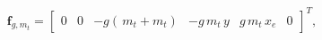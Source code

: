 \documentclass{article}
\begin{document}
\begin{small}
    \begin{equation}
        \mathbf{f}_{g,m_t} = 
        \begin{bmatrix}
         0 &  0 &  -g(\,m_{t}+m_{t}) &  -g\,m_{t}\,y    &  g\,m_{t}\,x_{e}  &  0
        \end{bmatrix} ^{T},
        \label{eq:fea:Fstat}
    \end{equation}
\end{small}




\end{document}

